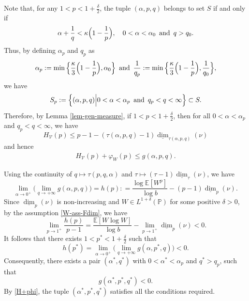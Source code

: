 \documentclass[12pt]{amsart}
\theoremstyle{definition}
\theoremstyle{remark}
\newcommand{\E}{\mathbb{E}}
\newcommand{\PP}{\mathbb{P}}
\newcommand{\ldim}{\underline{\dim}}
\newcommand{\an}{\text{\, and \,}}
\numberwithin{equation}{section}
\begin{document}
Note that, for any $1<p < 1 + \frac{\delta}{2}$, the tuple $(\alpha, p, q)$ belongs to set $S$  if and only if 
\[
\alpha + \frac{1}{q} < \kappa \Big( 1 - \frac{1}{p}\Big), \quad 0< \alpha< \alpha_0 \an q  > q_0. 
\]
Thus,  by defining $\alpha_p$ and $q_p$ as 
\[
\alpha_p: = \min \Big\{\frac{\kappa}{3} \Big( 1 - \frac{1}{p}\Big), \alpha_0\Big\} \an \frac{1}{q_p} : = \min \Big\{\frac{\kappa}{3} \Big( 1 - \frac{1}{p}\Big), \frac{1}{q_0}\Big\},
\]
we have 
\[
S_p : = \Big\{ (\alpha, p, q) \Big| 0<\alpha <\alpha_p \an   q_p<q <\infty  \Big\} \subset S. 
\]
Therefore, by Lemma \ref{lem-gen-measure}, if $1< p < 1+ \frac{\delta}{2}$, then for all $0< \alpha< \alpha_p$ and $q_p < q<\infty$, we have 
\[
H_{\mathcal{V}}(p) \le         p-1 -  (\tau(\alpha, p, q)- 1) \ldim_{\tau(\alpha, p, q)}(\nu)
\]
and hence 
\begin{align}\label{H+phi}
H_\mathcal{V}(p)  + \varphi_W(p) \le     g(\alpha, p, q).
\end{align}


Using the continuity  of $q\mapsto \tau(p, q, \alpha)$ and $\tau\mapsto (\tau- 1) \ldim_{\tau}(\nu)$, we have 
\[
\lim_{\alpha\to 0^{+}}\Big( \lim_{q\to +\infty} g(\alpha, p, q) \Big) =  h(p) : = \frac{\log \E[W^p]}{\log b} - (p- 1)  \ldim_{p}(\nu). 
\]
Since $\ldim_p(\nu)$ is non-increasing and $W\in L^{1+\delta}(\PP)$ for some positive $\delta>0$,  by the assumption \eqref{W-ass-Fdim}, we have 
\[
\lim_{p\to 1^{+}} \frac{h(p)}{p-1} = \frac{\E[W\log W]}{\log b} - \lim_{p\to 1^{+}} \ldim_{p}(\nu)<0. 
\]
It follows that there exists $1< p^*< 1+\frac{\delta}{2}$ such that 
\[
h(p^*)= \lim_{\alpha\to 0^{+}}\Big( \lim_{q\to +\infty} g(\alpha, p^*, q) \Big)<0. 
\]
Consequently, there exists a pair  $(\alpha^*, q^*)$ with $0< \alpha^*< \alpha_p$ and $q^*>q_p$, such that 
\[
g(\alpha^*, p^*, q^*)<0. 
\]
By \eqref{H+phi},  the tuple $(\alpha^*, p^*, q^*)$ satisfies all the conditions required.  



















\appendix


\section{}
\end{document}

